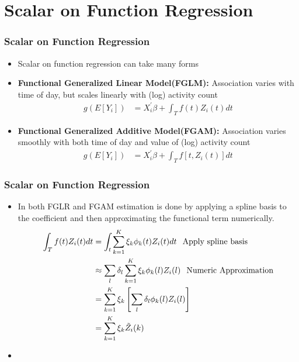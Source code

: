 \documentclass[10pt]{beamer}\usepackage[]{graphicx}\usepackage[]{color}
\begin{document}
\section{Scalar on Function Regression}



\begin{frame}
\frametitle{Scalar on Function Regression}

\begin{itemize}
\item Scalar on function regression can take many forms

\item \textbf{Functional Generalized Linear Model\footnotemark (FGLM):} Association varies with time of day, but scales linearly with (log) activity count
\begin{align*}
g(E[Y_i]) &= X_i^\prime\beta + \int_T f(t)Z_i(t)dt 
\end{align*}

\item \textbf{Functional Generalized Additive Model\footnotemark (FGAM):}  Association varies smoothly with both time of day and value of (log) activity count
\begin{align*}
g(E[Y_i]) &= X_i^\prime\beta + \int_T f[t,Z_i(t)]dt
\end{align*}

\end{itemize}


\end{frame}





\begin{frame}
\frametitle{Scalar on Function Regression}
\begin{itemize}

\item In both FGLR and FGAM estimation is done by applying a spline basis to the coefficient and then approximating the functional term numerically.
\begin{align*}
\int_T f(t)Z_i(t) dt &= \int_t \sum_{k=1}^K \xi_k \phi_k(t) Z_i(t) dt \hspace{0.25cm}\text{Apply spline basis} \\
&\approx \sum_l \delta_l \sum_{k=1}^K\xi_k \phi_k(l) Z_i(l) \hspace{0.25cm}\text{Numeric Approximation} \\
&= \sum_{k=1}^K\xi_k \left[\sum_l \delta_l  \phi_k(l) Z_i(l)\right]  \\
&= \sum_{k=1}^K\xi_k \tilde{Z}_i(k)  \\
\end{align*}
\item 
\end{itemize}
\end{frame}
\end{document}
